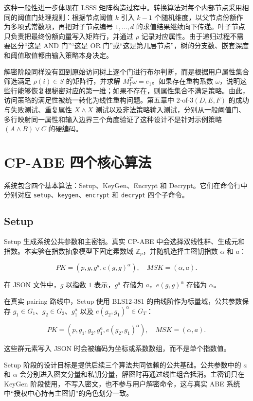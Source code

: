 这种一般性进一步体现在 LSSS 矩阵构造过程中。转换算法对每个内部节点采用相同的阈值门处理规则：根据节点阈值 $k$ 引入 $k-1$ 个随机维度，以父节点份额作为多项式常数项，再把对子节点编号 $1,\dots,d$ 的求值结果继续向下传递。叶子节点只负责把最终份额向量写入矩阵行，并通过 $\rho$ 记录对应属性。由于递归过程不需要区分“这是 AND 门”“这是 OR 门”或“这是第几层节点”，树的分支数、嵌套深度和阈值取值都由输入策略本身决定。

解密阶段同样没有回到原始访问树上逐个门进行布尔判断，而是根据用户属性集合筛选满足 $\rho(i)\in S$ 的矩阵行，并求解 $M_I^T\omega=e_1$。如果存在重构系数 $\omega$，说明这些行能够恢复根秘密对应的第一维；如果不存在，则属性集合不满足策略。由此，访问策略的满足性被统一转化为线性重构问题。第五章中 $2$-of-$3(D,E,F)$ 的成功与失败测试、重复属性 $X\wedge X$ 测试以及非法策略输入测试，分别从一般阈值门、多行映射同一属性和输入边界三个角度验证了这种设计不是针对示例策略 $(A\wedge B)\vee C$ 的硬编码。

\section{CP-ABE 四个核心算法}

系统包含四个基本算法：Setup、KeyGen、Encrypt 和 Decrypt。它们在命令行中分别对应 \verb|setup|、\verb|keygen|、\verb|encrypt| 和 \verb|decrypt| 四个子命令。

\subsection{Setup}

Setup 生成系统公共参数和主密钥。真实 CP-ABE 中会选择双线性群、生成元和指数。本实验在指数抽象模型下固定素数域 $\mathbb{Z}_p$，并随机选择主密钥指数 $\alpha$ 和 $a$：

\[
    PK=(p,g,g^a,e(g,g)^\alpha),\quad MSK=(\alpha,a).
\]

在 JSON 文件中，$g$ 以指数 $1$ 表示，$g^a$ 存储为 $a$，$e(g,g)^\alpha$ 存储为 $\alpha$。

在真实 pairing 路线中，Setup 使用 BLS12-381 的曲线阶作为标量域，公共参数保存 $g_1\in G_1$、$g_2\in G_2$、$g_1^a$ 以及 $e(g_2,g_1)^\alpha\in G_T$：

\[
    PK=(p,g_1,g_2,g_1^a,e(g_2,g_1)^\alpha),\quad MSK=(\alpha,a).
\]

这些群元素写入 JSON 时会被编码为坐标或系数数组，而不是单个指数值。

Setup 阶段的设计目标是提供后续三个算法共同依赖的公共基础。公共参数中的 $a$ 和 $\alpha$ 会分别进入密文分量和私钥分量，解密时再通过线性组合抵消。主密钥只在 KeyGen 阶段使用，不写入密文，也不参与用户解密命令，这与真实 ABE 系统中“授权中心持有主密钥”的角色划分一致。


